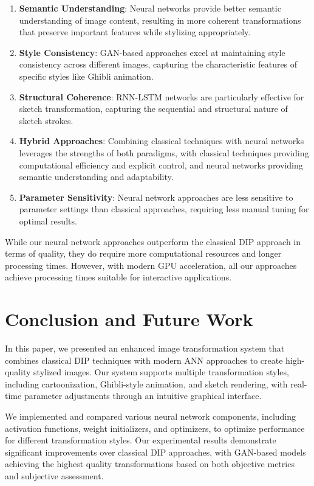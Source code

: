 \documentclass[conference]{IEEEtran}
\begin{document}
\begin{enumerate}
    \item \textbf{Semantic Understanding}: Neural networks provide better semantic understanding of image content, resulting in more coherent transformations that preserve important features while stylizing appropriately.
    
    \item \textbf{Style Consistency}: GAN-based approaches excel at maintaining style consistency across different images, capturing the characteristic features of specific styles like Ghibli animation.
    
    \item \textbf{Structural Coherence}: RNN-LSTM networks are particularly effective for sketch transformation, capturing the sequential and structural nature of sketch strokes.
    
    \item \textbf{Hybrid Approaches}: Combining classical techniques with neural networks leverages the strengths of both paradigms, with classical techniques providing computational efficiency and explicit control, and neural networks providing semantic understanding and adaptability.
    
    \item \textbf{Parameter Sensitivity}: Neural network approaches are less sensitive to parameter settings than classical approaches, requiring less manual tuning for optimal results.
\end{enumerate}

While our neural network approaches outperform the classical DIP approach in terms of quality, they do require more computational resources and longer processing times. However, with modern GPU acceleration, all our approaches achieve processing times suitable for interactive applications.

\section{Conclusion and Future Work}
In this paper, we presented an enhanced image transformation system that combines classical DIP techniques with modern ANN approaches to create high-quality stylized images. Our system supports multiple transformation styles, including cartoonization, Ghibli-style animation, and sketch rendering, with real-time parameter adjustments through an intuitive graphical interface.

We implemented and compared various neural network components, including activation functions, weight initializers, and optimizers, to optimize performance for different transformation styles. Our experimental results demonstrate significant improvements over classical DIP approaches, with GAN-based models achieving the highest quality transformations based on both objective metrics and subjective assessment.
\end{document}
